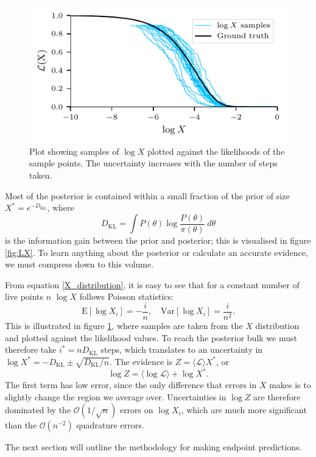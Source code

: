 \documentclass[usenatbib]{mnras} %
\newcommand{\Like}{\mathcal{L}}
\newcommand{\DKL}{D_\mathrm{KL}}
\begin{document}
\begin{figure}
\begin{center}
	\includegraphics{figures/X_samples.pdf}
\end{center}
\caption{Plot showing samples of $\log X$ plotted against the likelihoods of the sample points. The uncertainty increases with the number of steps taken.}
\label{fig:X_samples}
\end{figure}


Most of the posterior is contained within a small fraction of the prior of size $X^{*} = e^{-\DKL}$, where
\begin{equation}
\DKL = \int P(\theta) \log  \frac{P(\theta)}{\pi(\theta)} \ d\theta
\end{equation}
is the information gain between the prior and posterior; this is visualised in figure \ref{fig:LX}. To learn anything about the posterior or calculate an accurate evidence, we must compress down to this volume. 
\par
From equation \eqref{X_distribution}, it is easy to see that for a constant number of live points $n$ $\log X$ follows Poisson statistics:
\begin{equation}
	\mathrm{E}[\log X_i] = - \frac{i}{n}, \quad \mathrm{Var}[\log X_i] = \frac{i}{n^2}.
\end{equation}
This is illustrated in figure \ref{fig:X_samples}, where samples are taken from the $X$ distribution and plotted against the likelihood values. To reach the posterior bulk we must therefore take $i^{*} = n\DKL$ steps, which translates to an uncertainty in $\log X^{*} = -\DKL \pm \sqrt{\DKL/n}$. The evidence is $Z = \langle \Like \rangle X^{*}$, or
\begin{equation}
\log Z = \langle \log \Like \rangle + \log X^{*}.
\end{equation}
The first term has low error, since the only difference that errors in $X$ makes is to slightly change the region we average over. Uncertainties in $\log Z$ are therefore dominated by the $\mathcal{O}(1/\sqrt{n})$ errors on $\log X_i$, which are much more significant than the $\mathcal{O}(n^{-2})$ quadrature errors.
\par
The next section will outline the methodology for making endpoint predictions.
\end{document}
